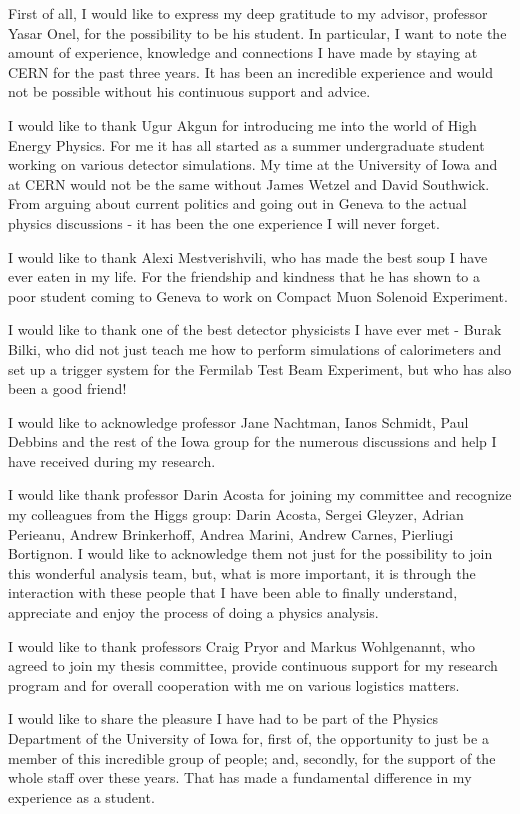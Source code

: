First of all, I would like to express my deep gratitude to my advisor, professor Yasar Onel, for the possibility to be his student. In particular, I want to note the amount of experience, knowledge and connections I have made by staying at CERN for the past three years. It has been an incredible experience and would not be possible without his continuous support and advice.

I would like to thank Ugur Akgun for introducing me into the world of High Energy Physics. For me it has all started as a summer undergraduate student working on various detector simulations. My time at the University of Iowa and at CERN would not be the same without James Wetzel and David Southwick. From arguing about current politics and going out in Geneva to the actual physics discussions - it has been the one experience I will never forget.

I would like to thank Alexi Mestverishvili, who has made the best soup I have ever eaten in my life. For the friendship and kindness that he has shown to a poor student coming to Geneva to work on Compact Muon Solenoid Experiment.

I would like to thank one of the best detector physicists I have ever met - Burak Bilki, who did not just teach me how to perform simulations of calorimeters and set up a trigger system for the Fermilab Test Beam Experiment, but who has also been a good friend!

I would like to acknowledge professor Jane Nachtman, Ianos Schmidt, Paul Debbins and the rest of the Iowa group for the numerous discussions and help I have received during my research.

I would like thank professor Darin Acosta for joining my committee and recognize my colleagues from the Higgs group: Darin Acosta, Sergei Gleyzer, Adrian Perieanu, Andrew Brinkerhoff, Andrea Marini, Andrew Carnes, Pierliugi Bortignon. I would like to acknowledge them not just for the possibility to join this wonderful analysis team, but, what is more important, it is through the interaction with these people that I have been able to finally understand, appreciate and enjoy the process of doing a physics analysis.

I would like to thank professors Craig Pryor and Markus Wohlgenannt, who agreed to join my thesis committee, provide continuous support for my research program and for overall cooperation with me on various logistics matters.

I would like to share the pleasure I have had to be part of the Physics Department of the University of Iowa for, first of, the opportunity to just be a member of this incredible group of people; and, secondly, for the support of the whole staff over these years. That has made a fundamental difference in my experience as a student.

